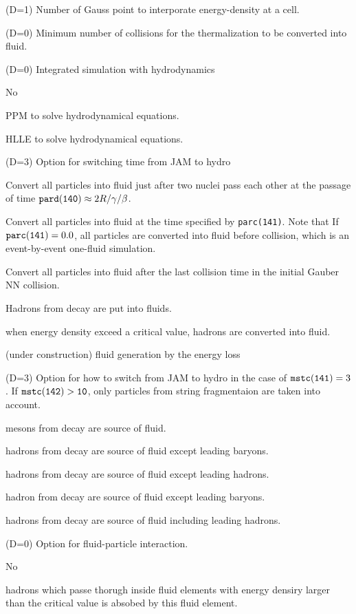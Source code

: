 \documentclass[]{article}
\newenvironment{entry}%
{\begin{list}{}{\setlength{\topsep}{0mm} \setlength{\itemsep}{0mm}
\setlength{\parskip}{0mm} \setlength{\parsep}{0mm}
\setlength{\leftmargin}{20mm} \setlength{\rightmargin}{0mm}
\setlength{\labelwidth}{18mm} \setlength{\labelsep}{2mm}}}%
{\end{list}}
\newenvironment{subentry}%
{\begin{list}{}{\setlength{\topsep}{0mm} \setlength{\itemsep}{0mm}
\setlength{\parskip}{0mm} \setlength{\parsep}{0mm}
\setlength{\leftmargin}{10mm} \setlength{\rightmargin}{0mm}
\setlength{\labelwidth}{18mm} \setlength{\labelsep}{2mm}}}%
{\end{list}}
\newcommand{\itemt}[1]{\item[{\tt #1}\hfill]}
\begin{document}
\begin{entry}
\itemt{mstc(138) :}(D=1) Number of Gauss point to interporate energy-density
at a cell.

\itemt{mstc(139) :}(D=0) Minimum number of collisions for the thermalization
 to be converted into fluid.

\itemt{mstc(140) :}(D=0) Integrated simulation with hydrodynamics
 \begin{subentry}
    \itemt{$=0$ :} No
    \itemt{$=1$ :} PPM to solve hydrodynamical equations.
    \itemt{$=2$ :} HLLE to solve hydrodynamical equations.
 \end{subentry}

\itemt{mstc(141) :}(D=3) Option for switching time from JAM to hydro
 \begin{subentry}
    \itemt{$=0$ :} Convert all particles into fluid
    just after two nuclei pass each other at the passage of
    time ${\tt pard(140)}\approx 2R/\gamma/\beta$.
    \itemt{$=1$ :} Convert all particles into fluid
    at the time specified by {\tt parc(141)}. 
      Note that If ${\tt parc(141)}=0.0$,
      all particles are converted into fluid before collision, 
      which is an event-by-event one-fluid simulation.

    \itemt{$=2$ :} Convert all particles into fluid after the
    last collision time in the initial Gauber NN collision.

    \itemt{$=3$ :} Hadrons from decay are put into fluids.
    \itemt{$=4$ :} when energy density exceed a critical value, hadrons
    are converted into fluid.

    \itemt{$=5$ :} (under construction) fluid generation by the energy loss
 \end{subentry}

\itemt{mstc(142) :}(D=3) Option for how to switch from JAM to hydro
in the case of ${\tt mstc(141)}=3$.
If ${\tt mstc(142)>10}$, only particles from string fragmentaion 
are taken into account.
 \begin{subentry}
    \itemt{$=1$ or 11 :} mesons from decay are source of fluid.
    \itemt{$=2$ or 12 :} hadrons from decay are source of fluid except leading
    baryons.
    \itemt{$=3$ or,13 :} hadrons from decay are source of fluid except leading
     hadrons.
    \itemt{$=4$ or,13 :} hadron from decay are source of fluid except leading
     baryons.
    \itemt{$=5$ or,14 :} hadrons from decay are source of fluid
    including leading hadrons.
\end{subentry}

\itemt{mstc(143) :}(D=0) Option for fluid-particle interaction.
 \begin{subentry}
    \itemt{$=0$ :} No
    \itemt{$=1$ :} hadrons which passe thorugh inside fluid elements
    with energy densiry larger than the critical value is absobed 
    by this fluid element.
\end{subentry}


\end{entry}
\end{document}
